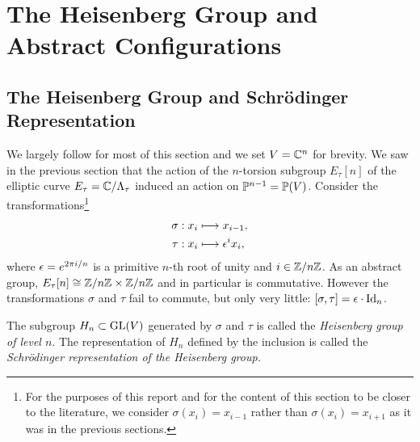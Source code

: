 \section{The Heisenberg Group and Abstract Configurations}

\subsection{The Heisenberg Group and Schr{\"o}dinger Representation}

We largely follow \cite{Hulek_1983} for most of this section and we set $V = \mathbb{C}^{n}$ for brevity. We saw in the previous section that the action of the $n$-torsion subgroup $E_{\tau}[n]$ of the elliptic curve $E_{\tau} = \mathbb{C}/\Lambda_{\tau}$ induced an action on $\mathbb{P}^{n-1} = \mathbb{P}(V)$.  Consider the transformations\footnote{For the purposes of this report and for the content of this section to be closer to the literature, we consider $\sigma(x_{i}) = x_{i-1}$ rather than $\sigma(x_{i}) = x_{i+1}$ as it was in the previous sections.}
\begin{equation*}
	\begin{split}
	\sigma: x_{i} &\longmapsto x_{i-1},\\
	\tau: x_{i} &\longmapsto \epsilon^{i}x_{i},
	\end{split}
\end{equation*}
where $\epsilon = e^{2\pi i/n}$ is a primitive $n$-th root of unity and $i \in \mathbb{Z}/n\mathbb{Z}$. As an abstract group, $E_{\tau}[n] \cong \mathbb{Z}/n\mathbb{Z} \times \mathbb{Z}/n\mathbb{Z}$ and in particular is commutative. However the transformations $\sigma$ and $\tau$ fail to commute, but only very little: $[\sigma,\tau] = \epsilon \cdot\operatorname{Id}_{n}$.\\

\begin{defn}
	The subgroup $H_{n} \subset \operatorname{GL}(V)$ generated by $\sigma$ and $\tau$ is called the \emph{Heisenberg group of level $n$}. The representation of $H_{n}$ defined by the inclusion is called the \emph{Schr{\"o}dinger representation of the Heisenberg group.}\\
\end{defn}

